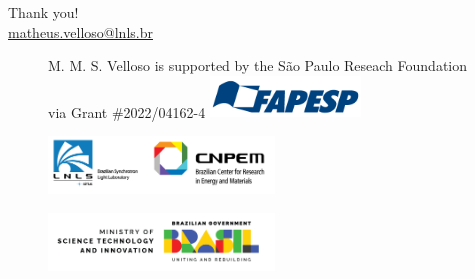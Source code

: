 \documentclass[aspectratio=169]{beamer}
\begin{document}
\begin{frame}
    Thank you!\\
    \vfill
    \url{matheus.velloso@lnls.br}\\
    \vfill
    \begin{figure}
        \centering
        \scriptsize
        M. M. S. Velloso is supported by the São Paulo Reseach Foundation via Grant \#2022/04162-4
        \includegraphics[width=4cm]{fapesp.png}
    \end{figure}
    \begin{minipage}{0.49\textwidth}
        \begin{figure}
            \includegraphics[width=6cm]{cnpem_lnls.png}
        \end{figure}
    \end{minipage}
    \begin{minipage}{0.49\textwidth}
        \begin{figure}
            \includegraphics[width=6cm]{mcti.png}
        \end{figure}
    \end{minipage}
    \vfill

\end{frame}
\end{document}
